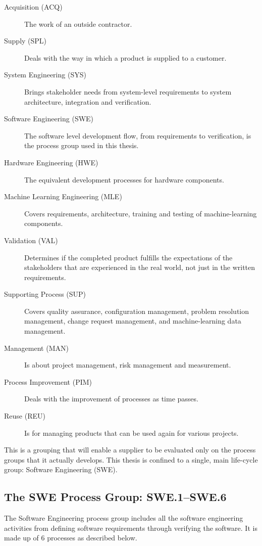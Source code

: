 \documentclass[a4paper, 12pt, oneside, openany, BCOR1cm,toc=chapterentrywithdots]{scrbook}
\begin{document}
\begin{description}
  \item[Acquisition (ACQ)] The work of an outside contractor.
  \item[Supply (SPL)] Deals with the way in which a product is supplied to a customer.
  \item[System Engineering (SYS)] Brings stakeholder needs from system-level requirements to
  system architecture, integration and verification.
  \item[Software Engineering (SWE)] The software level development flow, from requirements to
  verification, is the process group used in this thesis.
  \item[Hardware Engineering (HWE)] The equivalent development processes for hardware components.
  \item[Machine Learning Engineering (MLE)] Covers requirements, architecture, training and
  testing of machine-learning components.
  \item[Validation (VAL)] Determines if the completed product fulfills the expectations of the
  stakeholders that are experienced in the real world, not just in the written requirements.
  \item[Supporting Process (SUP)] Covers quality assurance, configuration management, problem
  resolution management, change request management, and machine-learning data management.
  \item[Management (MAN)] Is about project management, risk management and measurement.
  \item[Process Improvement (PIM)] Deals with the improvement of processes as time passes.
  \item[Reuse (REU)] Is for managing products that can be used again for various projects.
\end{description}

This is a grouping that will enable a supplier to be evaluated only on the process groups that it
actually develops. This thesis is confined to a single, main life-cycle group: Software
Engineering (SWE).

\subsection{The SWE Process Group: SWE.1--SWE.6}

The Software Engineering process group includes all the software engineering activities from
defining software requirements through verifying the software. It is made up of 6 processes as
described below.
\end{document}
